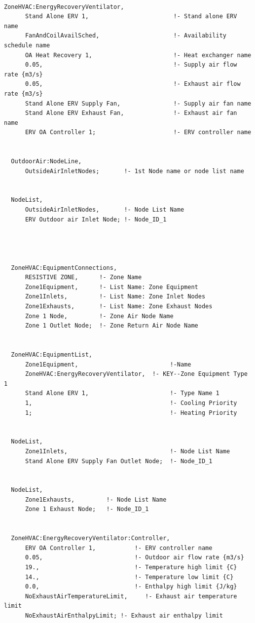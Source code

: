 \begin{lstlisting}

ZoneHVAC:EnergyRecoveryVentilator,
      Stand Alone ERV 1,                        !- Stand alone ERV name
      FanAndCoilAvailSched,                     !- Availability schedule name
      OA Heat Recovery 1,                       !- Heat exchanger name
      0.05,                                     !- Supply air flow rate {m3/s}
      0.05,                                     !- Exhaust air flow rate {m3/s}
      Stand Alone ERV Supply Fan,               !- Supply air fan name
      Stand Alone ERV Exhaust Fan,              !- Exhaust air fan name
      ERV OA Controller 1;                      !- ERV controller name


  OutdoorAir:NodeLine,
      OutsideAirInletNodes;       !- 1st Node name or node list name


  NodeList,
      OutsideAirInletNodes,       !- Node List Name
      ERV Outdoor air Inlet Node; !- Node_ID_1




  ZoneHVAC:EquipmentConnections,
      RESISTIVE ZONE,      !- Zone Name
      Zone1Equipment,      !- List Name: Zone Equipment
      Zone1Inlets,         !- List Name: Zone Inlet Nodes
      Zone1Exhausts,       !- List Name: Zone Exhaust Nodes
      Zone 1 Node,         !- Zone Air Node Name
      Zone 1 Outlet Node;  !- Zone Return Air Node Name


  ZoneHVAC:EquipmentList,
      Zone1Equipment,                          !-Name
      ZoneHVAC:EnergyRecoveryVentilator,  !- KEY--Zone Equipment Type 1
      Stand Alone ERV 1,                       !- Type Name 1
      1,                                       !- Cooling Priority
      1;                                       !- Heating Priority


  NodeList,
      Zone1Inlets,                             !- Node List Name
      Stand Alone ERV Supply Fan Outlet Node;  !- Node_ID_1


  NodeList,
      Zone1Exhausts,         !- Node List Name
      Zone 1 Exhaust Node;   !- Node_ID_1


  ZoneHVAC:EnergyRecoveryVentilator:Controller,
      ERV OA Controller 1,           !- ERV controller name
      0.05,                          !- Outdoor air flow rate {m3/s}
      19.,                           !- Temperature high limit {C}
      14.,                           !- Temperature low limit {C}
      0.0,                           !- Enthalpy high limit {J/kg}
      NoExhaustAirTemperatureLimit,     !- Exhaust air temperature limit
      NoExhaustAirEnthalpyLimit; !- Exhaust air enthalpy limit





\end{lstlisting}
